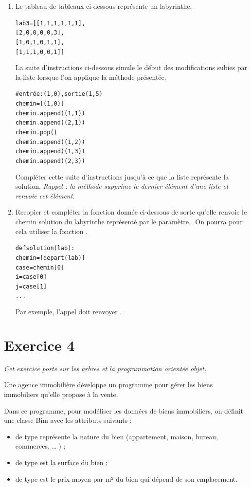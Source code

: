 \documentclass[11pt,a4paper,french,twoside]{PMCours}
\begin{document}
\begin{enumerate}
\begin{enumerate}
\item Le tableau de tableaux  ci-dessous représente un labyrinthe.
\begin{alltt}
lab3 = [[1, 1, 1, 1, 1, 1],
        [2, 0, 0, 0, 0, 3],
        [1, 0, 1, 0, 1, 1],
        [1, 1, 1, 0, 0, 1]]
\end{alltt}
La suite d'instructions ci-dessous simule le début des modifications subies par la liste
 lorsque l'on applique la méthode présentée.
\begin{alltt}
# entrée: (1, 0), sortie (1, 5)
chemin = [(1, 0)]
chemin.append((1, 1))
chemin.append((2, 1))
chemin.pop()
chemin.append((1, 2))
chemin.append((1, 3))
chemin.append((2, 3))
\end{alltt}
Compléter cette suite d'instructions jusqu'à ce que la liste  représente la
solution. \emph{Rappel : la méthode  supprime le dernier élément d'une liste et renvoie cet
élément.}
\item Recopier et compléter la fonction  donnée ci-dessous de sorte qu'elle
renvoie le chemin solution du labyrinthe représenté par le paramètre .
On pourra pour cela utiliser la fonction .
\begin{alltt}
def solution(lab):
    chemin = [depart(lab)]
    case = chemin[0]
    i = case[0]
    j = case[1]
    ...
\end{alltt}
Par exemple, l'appel  doit renvoyer \code{[(1, 0), (1, 1), (1, 2),
(1, 3), (1, 4), (1, 5), (2, 5), (3, 5), (4, 5), (5, 5), (6, 5)]}.
\end{enumerate}
\end{enumerate}


\newpage
\section*{Exercice 4}
\emph{Cet exercice porte sur les arbres et la programmation orientée objet.}

\medskip
Une agence immobilière développe un programme pour gérer les biens immobiliers qu'elle
propose à la vente.

Dans ce programme, pour modéliser les données de biens immobiliers, on définit une classe
Bim avec les attributs suivants :
\begin{itemize}
\item {} de type  représente la nature du bien (appartement, maison, bureau,
commerces, … ) ;
\item {} de type  est la surface du bien ;
\item {} de type  est le prix moyen par m² du bien qui dépend de son
emplacement.
\end{itemize}
\end{document}
